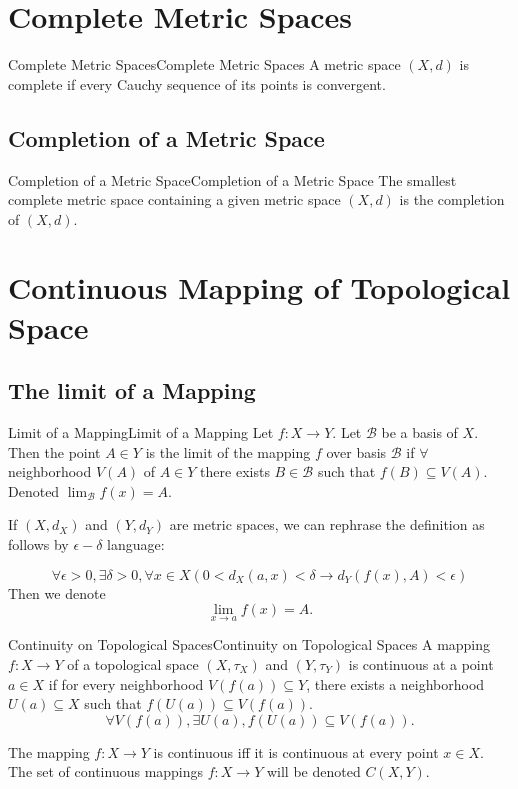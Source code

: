 \documentclass[../main.tex]{subfiles}
\begin{document}
\section{Complete Metric Spaces}
\begin{definition}{Complete Metric Spaces}{Complete Metric Spaces}
A metric space $(X,d)$ is complete if every Cauchy sequence of its points is convergent.
\end{definition}

\subsection{Completion of a Metric Space}
\begin{definition}{Completion of a Metric Space}{Completion of a Metric Space}
The smallest complete metric space containing a given metric space $(X,d)$ is the completion of $(X,d)$.
\end{definition}

\section{Continuous Mapping of Topological Space}
\subsection{The limit of a Mapping}
\begin{definition}{Limit of a Mapping}{Limit of a Mapping}
Let $f:X \rightarrow Y$. Let $\mathcal{B}$ be a basis of $X$. Then the point $A\in Y$ is the limit of the mapping $f$ over basis $\mathcal{B}$ if $\forall $ neighborhood $V(A)$ of $A\in Y$ there exists $B\in \mathcal{B}$ such that $f(B) \subseteq V(A)$. Denoted $\lim_{\mathcal{B}}f(x)=A $.
\end{definition}

If $(X,d_X)$ and $(Y,d_Y)$ are metric spaces, we can rephrase the definition as follows by $\epsilon-\delta$ language:

\begin{equation*}
\forall \epsilon>0, \exists \delta>0, \forall x\in X (0 < d_X(a,x) <\delta \rightarrow d_Y(f(x),A) <\epsilon)
\end{equation*}
Then we denote
\begin{equation*}
\lim_{x \to a} f(x) = A.
\end{equation*}

\begin{definition}{Continuity on Topological Spaces}{Continuity on Topological Spaces}
A mapping $f:X \rightarrow Y$ of a topological space $(X,\tau_X)$ and $(Y,\tau_Y)$ is continuous at a point $a\in X$ if for every neighborhood $V(f(a)) \subseteq Y$, there exists a neighborhood $U(a) \subseteq X$ such that $f(U(a)) \subseteq V(f(a))$.
\begin{equation*}
\forall V(f(a)), \exists U(a),f(U(a)) \subseteq V(f(a)).
\end{equation*}

The mapping $f:X \rightarrow Y$ is continuous iff it is continuous at every point $x\in X$. The set of continuous mappings $f:X \rightarrow  Y$ will be denoted $C(X,Y)$.
\end{definition}
\end{document}
